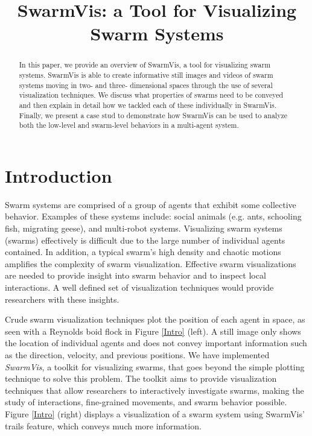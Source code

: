 \documentclass[conference]{IEEEtran}
\begin{document}
\title{SwarmVis: a Tool for Visualizing Swarm Systems}

\author{
\and
{}
}
\maketitle


\begin{abstract}
In this paper, we provide an overview of SwarmVis, a tool for visualizing swarm systems. SwarmVis is able to create informative still images and videos of swarm systems moving in two- and three- dimensional spaces through the use of several visualization techniques. We discuss what properties of swarms need to be conveyed and then explain in detail how we tackled each of these individually in SwarmVis. Finally, we present a case stud to demonstrate how SwarmVis can be used to analyze both the low-level and swarm-level behaviors in a multi-agent system.


\end{abstract}

\section{Introduction}
Swarm systems are comprised of a group of agents that exhibit some collective behavior. Examples of these systems include: social animals (e.g. ants\cite{couzin2003sol}, schooling fish\cite{parrish2002sof}, migrating geese\cite{reynolds1987}), 
and multi-robot systems\cite{mondada2004sbn}\cite{mclurkin2004srt}.
Visualizing swarm systems (swarms) effectively is difficult due to the large number of individual agents contained.
In addition, a typical swarm's high density and chaotic motions amplifies the complexity of swarm visualization.
Effective swarm visualizations are needed to provide insight into swarm behavior and to inspect local interactions.
A well defined set of visualization techniques would provide researchers with these insights.



Crude swarm visualization techniques plot the position of each agent in space,
as seen with a Reynolds boid flock\cite{reynolds1987} in Figure \ref{Intro} (left).
A still image only shows the location of individual agents and does not convey important information such as the direction, velocity, and previous positions.
We have implemented \textit{SwarmVis}, a toolkit for visualizing swarms, that goes beyond the simple plotting technique to solve this problem.
The toolkit aims to provide visualization techniques that allow researchers to interactively investigate swarms, making
the study of interactions, fine-grained movements, and swarm behavior possible.
Figure \ref{Intro} (right) displays a visualization of a swarm system using SwarmVis' trails feature, which conveys
much more information.
\end{document}
